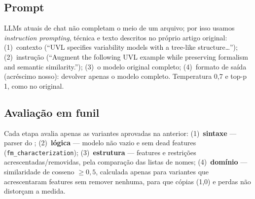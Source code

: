 \subsection{Prompt}
LLMs atuais de chat não completam o meio de um arquivo; por isso usamos \emph{instruction prompting}, técnica e texto descritos no próprio artigo original: (1)~contexto (``UVL specifies variability models with a tree-like structure\ldots''); (2)~instrução (``Augment the following UVL example while preserving formalism and semantic similarity.''); (3)~o modelo original completo; (4)~formato de saída (acréscimo nosso): devolver apenas o modelo \uvl{} completo. Temperatura 0,7 e top-p 1, como no original. 

\subsection{Avaliação em funil}
Cada etapa avalia apenas as variantes aprovadas na anterior: (1)~\textbf{sintaxe} --- parser do \flamapy{}; (2)~\textbf{lógica} --- modelo não vazio e sem dead features (\texttt{fm\_characterization}); (3)~\textbf{estrutura} --- features e restrições acrescentadas/removidas, pela comparação das listas de nomes; (4)~\textbf{domínio} --- similaridade de cosseno $\geq 0{,}5$, calculada apenas para variantes que acrescentaram features sem remover nenhuma, para que cópias (1,0) e perdas não distorçam a medida.
